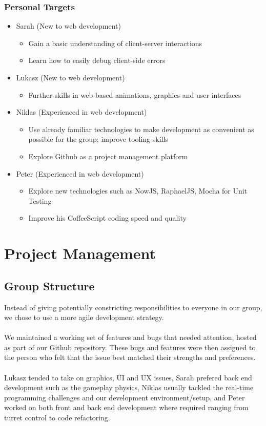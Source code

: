 \documentclass[a4wide, 11pt]{article}
\begin{document}
\subsubsection{Personal Targets}
\begin{itemize}
\item
  Sarah (New to web development)
  \begin{itemize}
    \item Gain a basic understanding of client-server interactions
    \item Learn how to easily debug client-side errors
  \end{itemize}

\item
  Lukasz (New to web development)
  \begin{itemize}
    \item Further skills in web-based animations, graphics and user interfaces
  \end{itemize}

\item
  Niklas (Experienced in web development)
  \begin{itemize}
    \item Use already familiar technologies to make development as convenient as possible for the group; improve tooling skills
    \item Explore Github as a project management platform
  \end{itemize}

\item
  Peter (Experienced in web development)
  \begin{itemize}
    \item Explore new technologies such as NowJS, RaphaelJS, Mocha for Unit Testing
    \item Improve his CoffeeScript coding speed and quality
  \end{itemize}
\end{itemize}

\section{Project Management}
\subsection{Group Structure}
Instead of giving potentially constricting responsibilities to everyone in our group, we chose to use a more agile development strategy.
\\ \\
We maintained a working set of features and bugs that needed attention, hosted as part of our Github repository. These bugs and features were then assigned to the person who felt that the issue best matched their strengths and preferences.
\\ \\
Lukasz tended to take on graphics, UI and UX issues, Sarah prefered back end development such as the gameplay physics, Niklas usually tackled the real-time programming challenges and our development environment/setup, and Peter worked on both front and back end development where required ranging from turret control to code refactoring.
\end{document}
